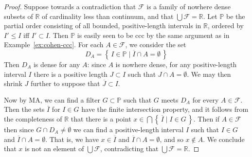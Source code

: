 \documentclass[11pt,oneside]{amsbook}
\newcommand{\set}[1]{\left\{\,#1\,\right\}}
\newcommand{\PP}{\mathbb P}
\newcommand{\RR}{\mathbb R}
\newcommand{\Meager}{\mathcal M}
\DeclareMathOperator{\dom}{dom}
\DeclareMathOperator{\cov}{\mathsf{cov}}
\DeclareMathOperator{\Diff}{Diff}
\theoremstyle{definition}
\theoremstyle{plain}
\theoremstyle{definition}
\theoremstyle{remark}
\numberwithin{equation}{section}
\numberwithin{figure}{section}
\begin{document}
\begin{proof}
  Suppose towards a contradiction that $\mathcal F$ is a family of nowhere dense subsets of $\RR$ of cardinality less than continuum, and that $\bigcup\mathcal F=\RR$. Let $\PP$ be the partial order consisting of all bounded, positive-length intervals in $\RR$, ordered by $I'\leq I$ iff $I'\subset I$. Then $\PP$ is easily seen to be ccc by the same argument as in Example~\ref{ex:cohen-ccc}. For each $A\in\mathcal F$, we consider the set
  \[D_A=\set{I\in\PP\mid \overline{I}\cap A=\emptyset}
  \]
  Then $D_A$ is dense for any $A$: since $A$ is nowhere dense, for any positive-length interval $I$ there is a positive length $J\subset I$ such that $J\cap A=\emptyset$. We may then shrink $J$ further to suppose that $\overline{J}\subset I$.

  Now by MA, we can find a filter $G\subset\PP$ such that $G$ meets $D_A$ for every $A\in\mathcal F$. Then the sets $\overline{I}$ for $I\in G$ have the finite intersection property, and it follows from the completeness of $\RR$ that there is a point $x\in\bigcap\set{\overline{I}\mid I\in G}$. Then if $A\in\mathcal F$ then since $G\cap D_A\neq\emptyset$ we can find a positive-length interval $I$ such that $I\in G$ and $\overline{I}\cap A=\emptyset$. That is, we have $x\in\overline{I}$ and $\overline{I}\cap A=\emptyset$, and so $x\notin A$. We conclude that $x$ is not an element of $\bigcup\mathcal F$, contradicting that $\bigcup\mathcal F=\RR$.
\end{proof}


\end{document}

